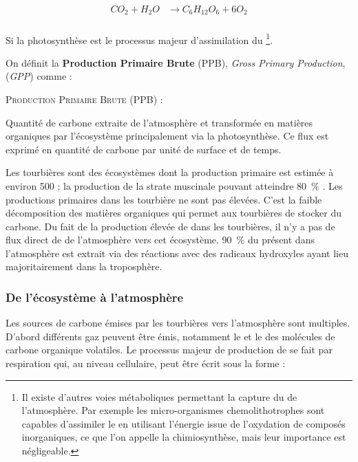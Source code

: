 $$\begin{aligned}
CO_{2} + H_{2}O  & \rightarrow C_{6}H_{12}O_{6} + 6O_{2}\\
\end{aligned} $$

Si la photosynthèse est le processus majeur d'assimilation du \coo \footnote{Il existe d'autres voies métaboliques permettant la capture du \coo de l'atmosphère.
Par exemple les micro-organismes chemolithotrophes sont capables d'assimiler le \coo en utilisant l'énergie issue de l'oxydation de composés inorganiques, ce que l'on appelle la chimiosynthèse, mais leur importance est négligeable.}.

On définit la \textbf{Production Primaire Brute} (PPB), \textit{Gross Primary Production}, (\textit{GPP}) comme :

\begin{pdef}
\textsc{Production Primaire Brute (PPB)} :

Quantité de carbone extraite de l'atmosphère et transformée en matières organiques par l'écosystème principalement via la photosynthèse.
Ce flux est exprimé en quantité de carbone par unité de surface et de temps.
\end{pdef}

Les tourbières sont des écosystèmes dont la production primaire est estimée à environ \SI{500}{\gcm} ;
la production de la strate muscinale pouvant atteindre \SI{80}{\percent} \citep{francez2000}.
Les productions primaires dans les tourbière ne sont pas élevées.
C'est la faible décomposition des matières organiques qui permet aux tourbières de stocker du carbone.
Du fait de la production élevée de \chh dans les tourbières, il n'y a pas de flux direct de \chh de l'atmosphère vers cet écosystème.
\SI{90}{\percent} du \chh présent dans l'atmosphère est extrait via des réactions avec des radicaux hydroxyles ayant lieu majoritairement dans la troposphère.

\subsubsection{De l'écosystème à l'atmosphère}

Les sources de carbone émises par les tourbières vers l'atmosphère sont multiples.
D'abord différents gaz peuvent être émis, notamment le \coo et le \chh des molécules de carbone organique volatiles.
Le processus majeur de production de \coo se fait par respiration qui, au niveau cellulaire, peut être écrit sous la forme :

